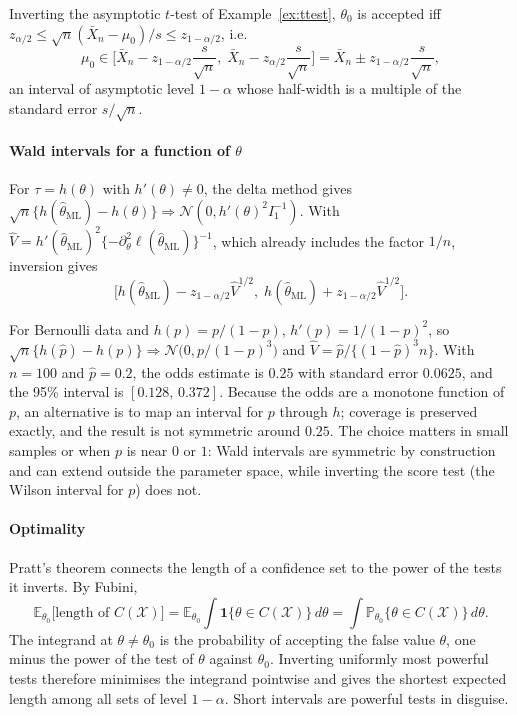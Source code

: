 \documentclass[11pt,a4paper]{article}
\newcommand{\E}{\mathbb{E}}
\renewcommand{\P}{\mathbb{P}}
\newcommand{\N}{\mathcal{N}}
\newcommand{\cd}{\Rightarrow}
\newcommand{\one}{\mathbf 1}
\newcommand{\Xbar}{\bar X_n}
\newcommand{\thml}{\hat\theta_{\mathrm{ML}}}
\begin{document}
\begin{example}[Mean]
Inverting the asymptotic $t$-test of Example~\ref{ex:ttest}, $\theta_0$ is accepted iff $z_{\alpha/2}\le\sqrt n(\Xbar-\mu_0)/s\le z_{1-\alpha/2}$, i.e.
\[
\mu_0\in\Big[\Xbar-z_{1-\alpha/2}\frac{s}{\sqrt n},\;\Xbar-z_{\alpha/2}\frac{s}{\sqrt n}\Big]=\Xbar\pm z_{1-\alpha/2}\frac{s}{\sqrt n},
\]
an interval of asymptotic level $1-\alpha$ whose half-width is a multiple of the standard error $s/\sqrt n$.
\end{example}

\paragraph{Wald intervals for a function of $\theta$}
For $\tau=h(\theta)$ with $h'(\theta)\ne0$, the delta method gives $\sqrt n\{h(\thml)-h(\theta)\}\cd\N(0,h'(\theta)^2I_1^{-1})$. With $\hat V=h'(\thml)^2\{-\partial^2_\theta\ell(\thml)\}^{-1}$, which already includes the factor $1/n$, inversion gives
\[
\Big[h(\thml)-z_{1-\alpha/2}\hat V^{1/2},\;h(\thml)+z_{1-\alpha/2}\hat V^{1/2}\Big].
\]

\begin{example}[Odds]
For Bernoulli data and $h(p)=p/(1-p)$, $h'(p)=1/(1-p)^2$, so $\sqrt n\{h(\hat p)-h(p)\}\cd\N\big(0,p/(1-p)^3\big)$ and $\hat V=\hat p/\{(1-\hat p)^3n\}$. With $n=100$ and $\hat p=0.2$, the odds estimate is $0.25$ with standard error $0.0625$, and the 95\% interval is $[0.128,\,0.372]$. Because the odds are a monotone function of $p$, an alternative is to map an interval for $p$ through $h$; coverage is preserved exactly, and the result is not symmetric around $0.25$. The choice matters in small samples or when $p$ is near $0$ or $1$: Wald intervals are symmetric by construction and can extend outside the parameter space, while inverting the score test (the Wilson interval for $p$) does not.
\end{example}

\paragraph{Optimality}
Pratt's theorem connects the length of a confidence set to the power of the tests it inverts. By Fubini,
\[
\E_{\theta_0}\big[\text{length of }C(\mathcal X)\big]=\E_{\theta_0}\int\one\{\theta\in C(\mathcal X)\}\,d\theta=\int\P_{\theta_0}\{\theta\in C(\mathcal X)\}\,d\theta .
\]
The integrand at $\theta\ne\theta_0$ is the probability of accepting the false value $\theta$, one minus the power of the test of $\theta$ against $\theta_0$. Inverting uniformly most powerful tests therefore minimises the integrand pointwise and gives the shortest expected length among all sets of level $1-\alpha$. Short intervals are powerful tests in disguise.
\end{document}
